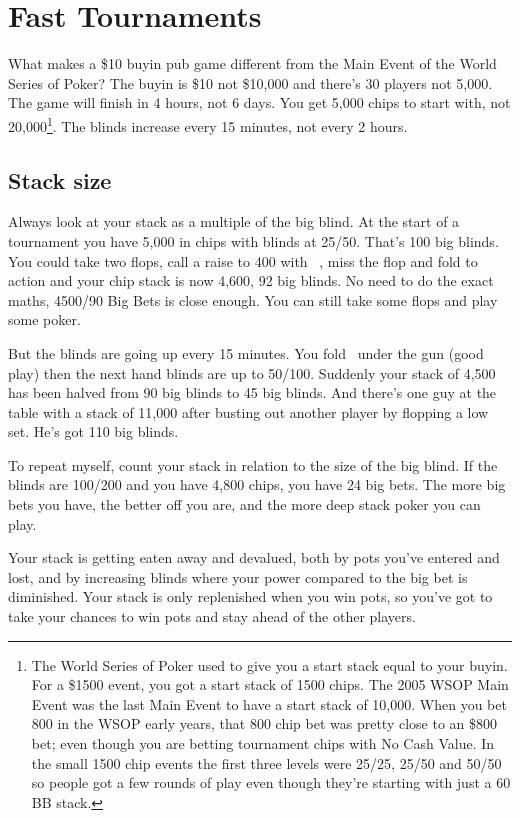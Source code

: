 \chapter{Fast Tournaments}


What makes a \$10 buyin pub game different from the Main Event of
the World Series of Poker? The buyin is \$10 not \$10,000 and there's 30
players not 5,000. The game will finish in 4 hours, not 6 days. You get
5,000 chips to start with, not 20,000\footnote{The World Series of Poker
used to give you a start stack equal to your buyin. For a \$1500 event,
you got a start stack of 1500 chips. The 2005 WSOP Main Event
was the last Main Event to have a start stack of 10,000. When you bet
800 in the WSOP early years, that 800 chip bet was pretty close to an
\$800 bet; even though you are betting tournament chips with No Cash
Value. In the small 1500 chip events the first three levels were
25/25, 25/50 and 50/50 so people got a few rounds of play even though
they're starting with just a 60 BB stack.}. The blinds increase every
15 minutes, not every 2 hours.

\section{Stack size}

Always look at your stack as a multiple of the big blind.
At the start of a tournament you have 5,000 in chips with blinds
at 25/50. That's 100 big blinds. You could take two flops, call a raise to
400 with \sixh\sixs\ , miss the flop and fold to action and your
chip stack is now 4,600, 92 big blinds. No need to do the exact
maths, 4500/90 Big Bets is close enough. You can still take some flops
and play some poker.

But the blinds are going up every 15 minutes. You fold \As\eigh\ under
the gun (good play) then the next hand blinds are up to 50/100.
Suddenly your stack of 4,500 has been halved from 90 big blinds to 45
big blinds. And there's one guy at the table with a stack of 11,000 after
busting out another player by flopping a low set. He's got 110 big blinds.

To repeat myself, count your stack in relation to the size of
the big blind. If the blinds are 100/200 and you have 4,800 chips, you
have 24 big bets. The more big bets you have, the better off you are,
and the more deep stack poker you can play.

Your stack is getting eaten away and devalued, both by pots you've entered
and lost, and by increasing blinds where your power compared to the big bet
is diminished. Your stack is only replenished when you win pots, so you've
got to take your chances to win pots and stay ahead of the other players.

